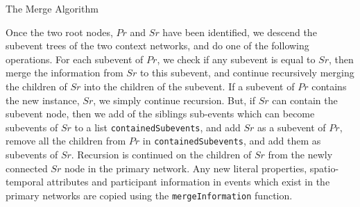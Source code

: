 \SetAlgoSkip{}
\begin{algorithm}[h!]
\dontprintsemicolon 
{}
\caption{The Merge Algorithm}
\label{alg:merge-alg}
\end{algorithm}

Once the two root nodes, $Pr$ and $Sr$ have been identified, we descend the subevent trees of the two context networks, and do one of the following operations. For each subevent of $Pr$, we check if any subevent is equal to $Sr$, then merge the information from $Sr$ to this subevent, and continue recursively merging the children of $Sr$ into the children of the subevent. If a subevent of $Pr$ contains the new instance, $Sr$, we simply continue recursion. But, if $Sr$ can contain the subevent node, then we add of the siblings sub-events which can become subevents of $Sr$ to a list \texttt{containedSubevents}, and add $Sr$ as a subevent of $Pr$, remove all the children from $Pr$ in \texttt{containedSubevents}, and add them as subevents of $Sr$. Recursion is continued on the children of $Sr$ from the newly connected $Sr$ node in the primary network. Any new literal properties, spatio-temporal attributes and participant information in events which exist in the primary networks are copied using the \texttt{mergeInformation} function.

